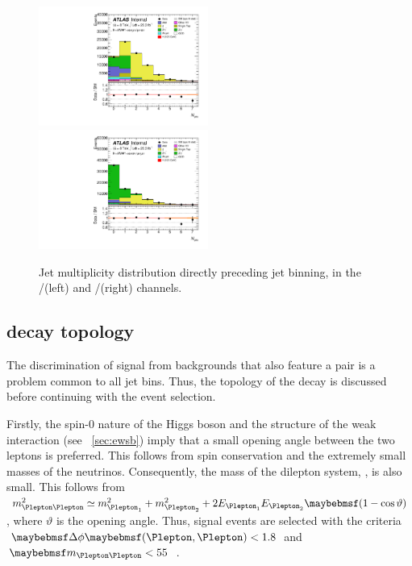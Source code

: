 \begin{figure}
	\includegraphics[width=0.495\textwidth]{tex/selection/emme_CutMETRel_m_jet_n_upTo7_mh125_lin}
	\hfill
	\includegraphics[width=0.495\textwidth]{tex/selection/eemm_CutMETRel_m_jet_n_upTo7_mh125_lin}
	\caption{Jet multiplicity distribution directly preceding jet binning, in the 
	\emch/\mech (left) and \eech/\mmch (right) channels.}
	\label{fig:sel:njets}
\end{figure}



\subsection{\HWWlvlv decay topology}
\label{sec:selection:higgs_decay}

The discrimination of \HWW signal from backgrounds that also feature a \WW pair is a 
problem common to all jet bins. Thus, the topology of the \HWWlvlv decay is discussed 
before continuing with the event selection.

Firstly, the spin-0 nature of the Higgs boson and the \VminusA structure of the weak 
interaction (see \Section~\ref{sec:ewsb}) imply that a small opening angle between the 
two leptons is preferred. This follows from spin conservation and the extremely small 
masses of the neutrinos. Consequently, the mass of the dilepton system, \mll, is also 
small. This follows from $m_{\Plepton\Plepton}^2 \simeq m_{\Plepton_1}^2 + 
m_{\Plepton_2}^2 + 2 E_{\Plepton_1} E_{\Plepton_2} \parenths{1 - \cos\vartheta}$, where 
$\vartheta$ is the opening angle. Thus, signal events are selected with the criteria 
$\dphill < 1.8$ and \unit{$\mll < 55$}{\GeV}.

